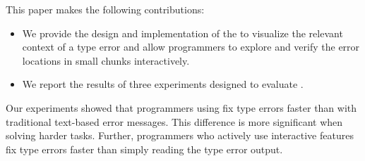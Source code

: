 This paper makes the following contributions:
\begin{itemize}
\item We provide the design and implementation of the \chameleon{} to visualize the relevant context of a type error and allow programmers to explore and verify the error locations in small chunks interactively.  
\item {
    We report the results of three experiments designed to evaluate \chameleon{}.}
\end{itemize}

Our experiments showed that programmers using \chameleon{} fix type errors faster than with traditional text-based error messages. This difference is more significant when solving harder tasks. Further, programmers who actively use \chameleon{} interactive features fix type errors faster than simply reading the type error output.
